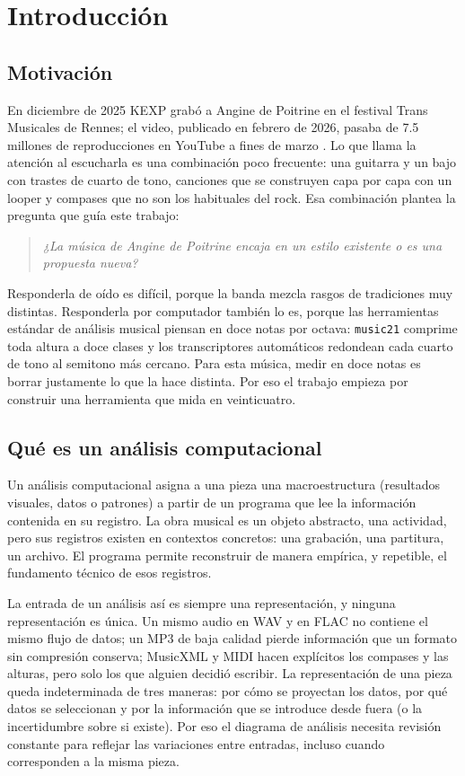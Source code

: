 \chapter{Introducción}\label{cap:introduccion}

\section{Motivación}

En diciembre de 2025 KEXP grabó a Angine de Poitrine en el festival Trans Musicales de Rennes; el video, publicado en
febrero de 2026, pasaba de 7.5 millones de reproducciones en YouTube a fines de marzo \citep{kexp2026}. Lo que llama la atención al escucharla es una combinación poco frecuente: una guitarra y
un bajo con trastes de cuarto de tono, canciones que se construyen capa por capa con un looper y compases que no son los
habituales del rock. Esa combinación plantea la pregunta que
guía este trabajo:

\begin{quote}
\itshape ¿La música de Angine de Poitrine encaja en un estilo existente o es una propuesta nueva?
\end{quote}

Responderla de oído es difícil, porque la banda mezcla rasgos de tradiciones muy distintas. Responderla por computador
también lo es, porque las herramientas estándar de análisis musical piensan en doce notas por octava: \texttt{music21}
comprime toda altura a doce clases y los transcriptores automáticos redondean cada cuarto de tono al semitono más
cercano. Para esta música, medir en doce notas es borrar justamente lo que la hace distinta. Por eso el trabajo empieza
por construir una herramienta que mida en veinticuatro.

\section{Qué es un análisis computacional}

Un análisis computacional asigna a una pieza una macroestructura (resultados visuales, datos o patrones) a partir de un
programa que lee la información contenida en su registro. La obra musical es un objeto abstracto, una actividad, pero sus
registros existen en contextos concretos: una grabación, una partitura, un archivo. El programa permite reconstruir de
manera empírica, y repetible, el fundamento técnico de esos registros.

La entrada de un análisis así es siempre una representación, y ninguna representación es única. Un mismo audio en WAV y
en FLAC no contiene el mismo flujo de datos; un MP3 de baja calidad pierde información que un formato sin compresión
conserva; MusicXML y MIDI hacen explícitos los compases y las alturas, pero solo los que alguien decidió escribir. La
representación de una pieza queda indeterminada de tres maneras: por cómo se proyectan los datos, por qué datos se
seleccionan y por la información que se introduce desde fuera (o la incertidumbre sobre si existe). Por eso el diagrama
de análisis necesita revisión constante para reflejar las variaciones entre entradas, incluso cuando corresponden a la
misma pieza.

